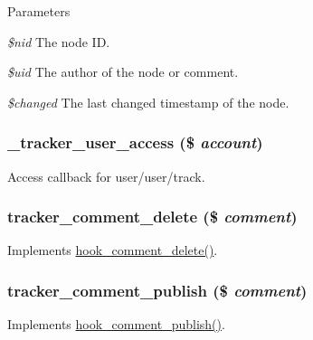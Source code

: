 \begin{DoxyParams}{Parameters}
\item[{\em \$nid}]The node ID. \item[{\em \$uid}]The author of the node or comment. \item[{\em \$changed}]The last changed timestamp of the node. \end{DoxyParams}
\hypertarget{tracker_8module_aaf6435001007410f28f708aba215179a}{
\subsubsection[{\_\-tracker\_\-user\_\-access}]{\setlength{\rightskip}{0pt plus 5cm}\_\-tracker\_\-user\_\-access (\$ {\em account})}}
\label{tracker_8module_aaf6435001007410f28f708aba215179a}
Access callback for user/user/track. \hypertarget{tracker_8module_abe592f3f5d21a4930f7f56177043efbb}{
\subsubsection[{tracker\_\-comment\_\-delete}]{\setlength{\rightskip}{0pt plus 5cm}tracker\_\-comment\_\-delete (\$ {\em comment})}}
\label{tracker_8module_abe592f3f5d21a4930f7f56177043efbb}
Implements \hyperlink{group__hooks_gab8d94c5665313a2d174628cc219f0395}{hook\_\-comment\_\-delete()}. \hypertarget{tracker_8module_aa2b8956283fed818e733b2e1ebaf79a9}{
\subsubsection[{tracker\_\-comment\_\-publish}]{\setlength{\rightskip}{0pt plus 5cm}tracker\_\-comment\_\-publish (\$ {\em comment})}}
\label{tracker_8module_aa2b8956283fed818e733b2e1ebaf79a9}
Implements \hyperlink{group__hooks_ga4c4be9019e5cc7f92e8ccc03b595a64b}{hook\_\-comment\_\-publish()}.

